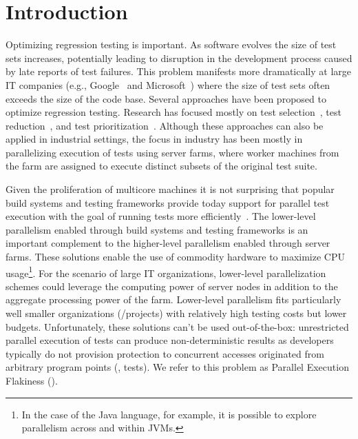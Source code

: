 \section{Introduction}

Optimizing regression testing is important.  As software evolves the
size of test sets increases, potentially leading to disruption in the
development process caused by late reports of test failures.  This
problem manifests more dramatically at large IT companies
(e.g., Google~ and
Microsoft~) where the size of test sets often exceeds the
size of the code base.  Several approaches have been proposed to
optimize regression testing.  Research has focused mostly on test
selection~, test reduction~, and test
prioritization~.  Although these approaches can also be
applied in industrial settings, the focus in industry has been
mostly in parallelizing execution of tests using server
farms, where worker machines
from the farm are assigned to execute distinct subsets of the original
test suite.

Given the proliferation of multicore machines it is not surprising
that popular build systems and testing frameworks provide today
support for parallel test execution with the goal of running tests
more efficiently~\cite{junit-org,testng,nunit,maven-surefire-plugin}.
The lower-level parallelism enabled through build systems and testing
frameworks is an important complement to the higher-level parallelism
enabled through server farms.  These solutions enable the use of
commodity hardware to maximize CPU usage\footnote{In the case of the
  Java language, for example, it is possible to explore parallelism
  across and within JVMs.}.  For the scenario of large IT
organizations, lower-level parallelization schemes could leverage the
computing power of server nodes in addition to the aggregate
processing power of the farm.  Lower-level parallelism fits
particularly well smaller organizations (/projects) with relatively
high testing costs but lower budgets.  Unfortunately, these solutions
can't be used out-of-the-box: unrestricted parallel execution of tests
can produce non-deterministic results as developers typically do not
provision protection to concurrent accesses originated from arbitrary
program points (\ie{}, tests).  We refer to this problem as Parallel
Execution Flakiness (\pef{}).

